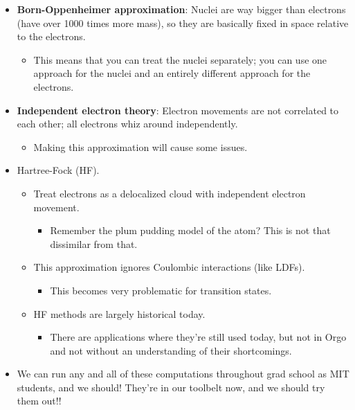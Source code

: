 \documentclass[../notes.tex]{subfiles}
\begin{document}
\begin{itemize}
\begin{itemize}
\begin{itemize}
        \end{itemize}
    \end{itemize}
    \item \textbf{Born-Oppenheimer approximation}: Nuclei are way bigger than electrons (have over 1000 times more mass), so they are basically fixed in space relative to the electrons.
    \begin{itemize}
        \item This means that you can treat the nuclei separately; you can use one approach for the nuclei and an entirely different approach for the electrons.
    \end{itemize}
    \item \textbf{Independent electron theory}: Electron movements are not correlated to each other; all electrons whiz around independently.
    \begin{itemize}
        \item Making this approximation will cause some issues.
    \end{itemize}
    \item Hartree-Fock (HF).
    \begin{itemize}
        \item Treat electrons as a delocalized cloud with independent electron movement.
        \begin{itemize}
            \item Remember the plum pudding model of the atom? This is not that dissimilar from that.
        \end{itemize}
        \item This approximation ignores Coulombic interactions (like LDFs).
        \begin{itemize}
            \item This becomes very problematic for transition states.
        \end{itemize}
        \item HF methods are largely historical today.
        \begin{itemize}
            \item There are applications where they're still used today, but not in Orgo and not without an understanding of their shortcomings.
        \end{itemize}
    \end{itemize}
    \item We can run any and all of these computations throughout grad school as MIT students, and we should! They're in our toolbelt now, and we should try them out!!

\end{itemize}
\end{document}
